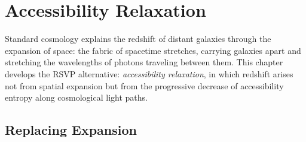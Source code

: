 \chapter{Accessibility Relaxation}



Standard cosmology explains the redshift of distant galaxies through
the expansion of space: the fabric of spacetime stretches, carrying
galaxies apart and stretching the wavelengths of photons traveling
between them. This chapter develops the RSVP alternative: \emph{accessibility
relaxation}, in which redshift arises not from spatial expansion but
from the progressive decrease of accessibility entropy along cosmological
light paths.

\section{Replacing Expansion}


